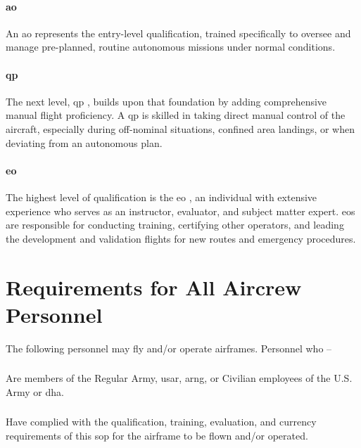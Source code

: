             \paragraph{\acl{ao}} An \acl{ao} represents the entry-level qualification, trained specifically to oversee and manage pre-planned, routine autonomous missions under normal conditions. 

           \paragraph{\acl{qp}}The next level, \acl{qp} , builds upon that foundation by adding comprehensive manual flight proficiency. A \ac{qp} is skilled in taking direct manual control of the aircraft, especially during off-nominal situations, confined area landings, or when deviating from an autonomous plan. 

            \paragraph{\acl{eo}}The highest level of qualification is the \acl{eo} , an individual with extensive experience who serves as an instructor, evaluator, and subject matter expert. \ac{eo}s are responsible for conducting training, certifying other operators, and leading the development and validation flights for new routes and emergency procedures.

    \section{Requirements for All Aircrew Personnel}\label{sec:qual-reqsall}
    
        The following personnel may fly and/or operate \projectmars{} airframes.  Personnel who --

            \subsubsection{} Are members of the Regular Army, \ac{usar}, \ac{arng}, or Civilian employees of the U.S. Army or \ac{dha}.

            \subsubsection{} Have complied with the qualification, training, evaluation, and currency requirements of this \ac{sop} for the airframe to be flown and/or operated.

